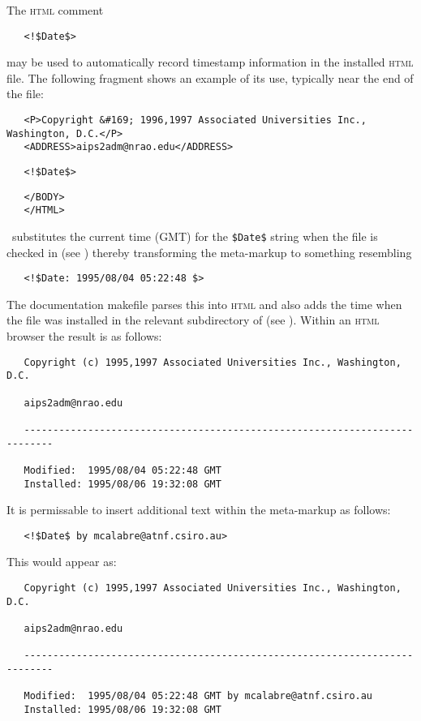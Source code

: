 The \textsc{html} comment

\noindent
\verb+   <!$+\verb+Date$>+

\noindent
may be used to automatically record timestamp information in the installed
\textsc{html} file.  The following fragment shows an example of its use,
typically near the end of the file:

\begin{verbatim}
   <P>Copyright &#169; 1996,1997 Associated Universities Inc., Washington, D.C.</P>
   <ADDRESS>aips2adm@nrao.edu</ADDRESS>
\end{verbatim}

\noindent
\verb+   <!$+\verb+Date$>+

\begin{verbatim}
   </BODY>
   </HTML>
\end{verbatim}

\noindent
\rcs\ substitutes the current time (GMT) for the \verb+$+\verb+Date$+ string
when the file is checked in (see ) thereby transforming the
meta-markup to something resembling

\noindent
\verb+   <!$+\verb+Date: 1995/08/04 05:22:48 $>+

\noindent
The documentation makefile parses this into \textsc{html} and also adds the
time when the  file was installed in the relevant subdirectory of
 (see ).  Within an \textsc{html} browser the
result is as follows:

\begin{verbatim}
   Copyright (c) 1995,1997 Associated Universities Inc., Washington, D.C.

   aips2adm@nrao.edu

   ---------------------------------------------------------------------------

   Modified:  1995/08/04 05:22:48 GMT
   Installed: 1995/08/06 19:32:08 GMT
\end{verbatim}

\noindent
It is permissable to insert additional text within the meta-markup as follows:

\noindent
\verb+   <!$+\verb+Date$ by mcalabre@atnf.csiro.au>+

\noindent
This would appear as:

\begin{verbatim}
   Copyright (c) 1995,1997 Associated Universities Inc., Washington, D.C.

   aips2adm@nrao.edu

   ---------------------------------------------------------------------------

   Modified:  1995/08/04 05:22:48 GMT by mcalabre@atnf.csiro.au
   Installed: 1995/08/06 19:32:08 GMT
\end{verbatim}

